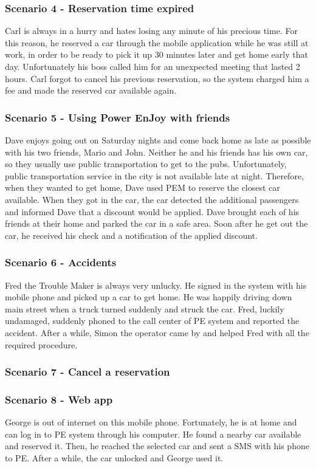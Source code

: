 \subsubsection{Scenario 4 - Reservation time expired}
Carl is always in a hurry and hates losing any minute of his precious time. For this reason, he reserved a car through the mobile application while he was still at work, in order to be ready to pick it up 30 minutes later and get home early that day. Unfortunately his boss called him for an unexpected meeting that lasted 2 hours. Carl forgot to cancel his previous reservation, so the system charged him a fee and made the reserved car available again.

\subsubsection{Scenario 5 - Using Power EnJoy with friends}
Dave enjoys going out on Saturday nights and come back home as late as possible with his two friends, Mario and John.  Neither he and his friends has his own car, so they usually use public transportation to get to the pubs. Unfortunately, public transportation service in the city is not available late at night. Therefore, when they wanted to get home, Dave used PEM to reserve the closest car available. When they got in the car, the car detected the additional passengers and informed Dave that a discount would be applied. Dave brought each of his friends at their home and parked the car in a safe area. Soon after he get out the car, he received his check and a notification of the applied discount.

\subsubsection{Scenario 6 - Accidents}
Fred the Trouble Maker is always very unlucky. He signed in the system with his mobile phone and picked up a car to get home. He was happily driving down main street when a truck turned suddenly and struck the car. Fred, luckily undamaged, suddenly phoned to the call center of PE system and reported the accident. After a while, Simon the operator came by and helped Fred with all the required procedure. 

\subsubsection{Scenario 7 - Cancel a reservation}


\subsubsection{Scenario 8 - Web app}
George is out of internet on this mobile phone. Fortunately, he is at home and can log in to PE system through his computer. He found a nearby car available and reserved it. Then, he reached the selected car and sent a SMS with his phone to PE. After a while, the car unlocked and George used it.


